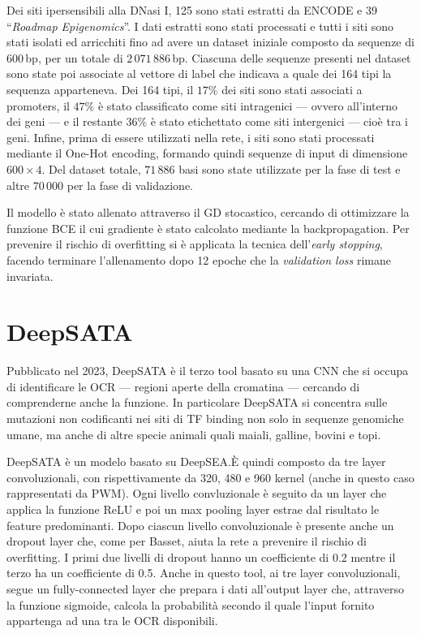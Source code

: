 Dei siti ipersensibili alla DNasi I, 125 sono stati estratti da \acs{ENCODE} e 39 ``\textit{Roadmap Epigenomics}''. I dati estratti sono stati processati e tutti i siti sono stati isolati ed arricchiti fino ad avere un dataset iniziale composto da sequenze di 600\,bp, per un totale di $2\,071\,886$\,bp. Ciascuna delle sequenze presenti nel dataset sono state poi associate al vettore di label che indicava a quale dei 164 tipi la sequenza apparteneva. Dei 164 tipi, il $17\%$ dei siti sono stati associati a promoters, il $47\%$ è stato classificato come siti intragenici — ovvero all'interno dei geni — e il restante $36\%$ è stato etichettato come siti intergenici — cioè tra i geni. Infine, prima di essere utilizzati nella rete, i siti sono stati processati mediante il One-Hot encoding, formando quindi sequenze di input di dimensione $600\times 4$. Del dataset totale, $71\,886$ basi sono state utilizzate per la fase di test e altre $70\,000$ per la fase di validazione.

Il modello è stato allenato attraverso il \acs{GD} stocastico, cercando di ottimizzare la funzione \acs{BCE} il cui gradiente è stato calcolato mediante la backpropagation. Per prevenire il rischio di overfitting si è applicata la tecnica dell'\textit{early stopping}, facendo terminare l'allenamento dopo 12 epoche che la \textit{validation loss} rimane invariata. %

\section{DeepSATA}\label{sec:DeepSATA}
% 
Pubblicato nel 2023, DeepSATA è il terzo tool basato su una \acs{CNN} che si occupa di identificare le \acs{OCR} — regioni aperte della cromatina — cercando di comprenderne anche la funzione. In particolare DeepSATA si concentra sulle mutazioni non codificanti nei siti di \acs{TF} binding non solo in sequenze genomiche umane, ma anche di altre specie animali quali maiali, galline, bovini e topi.

DeepSATA è un modelo basato su DeepSEA.\@ È quindi composto da tre layer convoluzionali, con rispettivamente da 320, 480 e 960 kernel (anche in questo caso rappresentati da \acs{PWM}). Ogni livello convluzionale è seguito da un layer che applica la funzione \acs{ReLU} e poi un max pooling layer estrae dal risultato le feature predominanti. Dopo ciascun livello convoluzionale è presente anche un dropout layer che, come per Basset, aiuta la rete a prevenire il rischio di overfitting. I primi due livelli di dropout hanno un coefficiente di 0.2 mentre il terzo ha un coefficiente di 0.5. Anche in questo tool, ai tre layer convoluzionali, segue un fully-connected layer che prepara i dati all'output layer che, attraverso la funzione sigmoide, calcola la probabilità secondo il quale l'input fornito appartenga ad una tra le \acs{OCR} disponibili.

